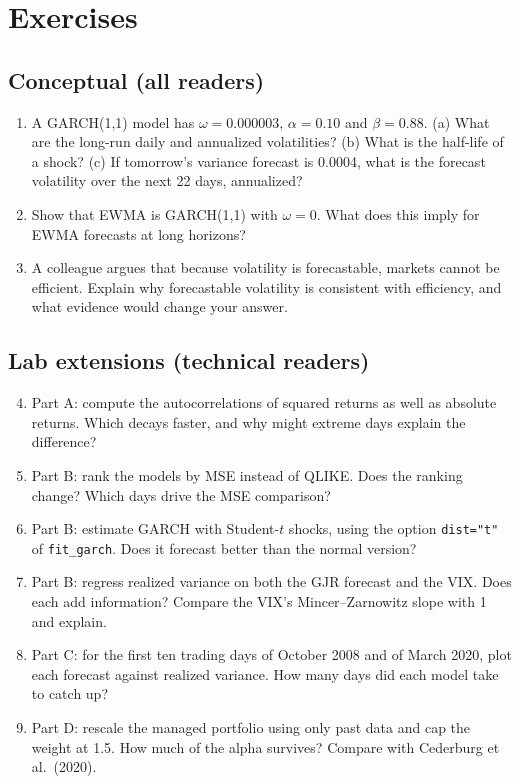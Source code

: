 \section*{Exercises}

\subsection*{Conceptual (all readers)}

\begin{enumerate}
  \item A GARCH(1,1) model has $\omega = 0.000003$, $\alpha = 0.10$ and $\beta = 0.88$. (a) What are the long-run daily and annualized volatilities? (b) What is the half-life of a shock? (c) If tomorrow's variance forecast is 0.0004, what is the forecast volatility over the next 22 days, annualized?
  \item Show that EWMA is GARCH(1,1) with $\omega = 0$. What does this imply for EWMA forecasts at long horizons?
  \item A colleague argues that because volatility is forecastable, markets cannot be efficient. Explain why forecastable volatility is consistent with efficiency, and what evidence would change your answer.
\end{enumerate}

\subsection*{Lab extensions (technical readers)}

\begin{enumerate}
  \setcounter{enumi}{3}
  \item Part A: compute the autocorrelations of squared returns as well as absolute returns. Which decays faster, and why might extreme days explain the difference?
  \item Part B: rank the models by MSE instead of QLIKE. Does the ranking change? Which days drive the MSE comparison?
  \item Part B: estimate GARCH with Student-$t$ shocks, using the option \texttt{dist="t"} of \texttt{fit\_garch}. Does it forecast better than the normal version?
  \item Part B: regress realized variance on both the GJR forecast and the VIX. Does each add information? Compare the VIX's Mincer--Zarnowitz slope with 1 and explain.
  \item Part C: for the first ten trading days of October 2008 and of March 2020, plot each forecast against realized variance. How many days did each model take to catch up?
  \item Part D: rescale the managed portfolio using only past data and cap the weight at 1.5. How much of the alpha survives? Compare with Cederburg et al.\ (2020).
\end{enumerate}
